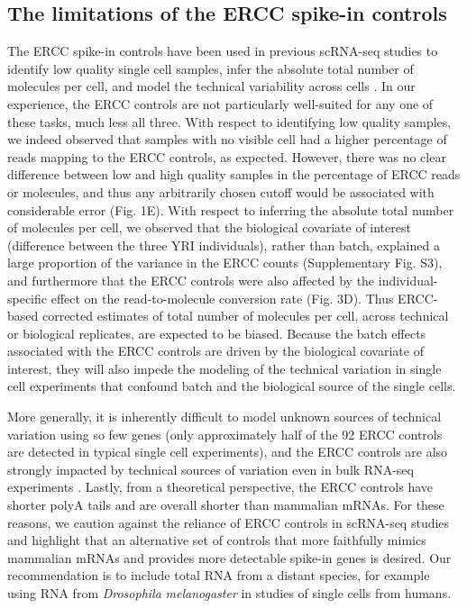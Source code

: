 \subsection{The limitations of the ERCC spike-in
controls}\label{the-limitations-of-the-ercc-spike-in-controls}

The ERCC spike-in controls have been used in previous scRNA-seq studies
to identify low quality single cell samples, infer the absolute total
number of molecules per cell, and model the technical variability across
cells \citep{Brennecke2013, Grun2014, Ding2015, Vallejos2015}. In our
experience, the ERCC controls are not particularly well-suited for any
one of these tasks, much less all three. With respect to identifying low
quality samples, we indeed observed that samples with no visible cell
had a higher percentage of reads mapping to the ERCC controls, as
expected. However, there was no clear difference between low and high
quality samples in the percentage of ERCC reads or molecules, and thus
any arbitrarily chosen cutoff would be associated with considerable
error (Fig. 1E). With respect to inferring the absolute total number of
molecules per cell, we observed that the biological covariate of
interest (difference between the three YRI individuals), rather than
batch, explained a large proportion of the variance in the ERCC counts
(Supplementary Fig. S3), and furthermore that the ERCC controls were
also affected by the individual-specific effect on the read-to-molecule
conversion rate (Fig. 3D). Thus ERCC-based corrected estimates of total
number of molecules per cell, across technical or biological replicates,
are expected to be biased. Because the batch effects associated with the
ERCC controls are driven by the biological covariate of interest, they
will also impede the modeling of the technical variation in single cell
experiments that confound batch and the biological source of the single
cells.

More generally, it is inherently difficult to model unknown sources of
technical variation using so few genes \citep{Risso2014} (only
approximately half of the 92 ERCC controls are detected in typical
single cell experiments), and the ERCC controls are also strongly
impacted by technical sources of variation even in bulk RNA-seq
experiments \citep{SEQC/MAQC-IIIConsortium2014}. Lastly, from a
theoretical perspective, the ERCC controls have shorter polyA tails and
are overall shorter than mammalian mRNAs. For these reasons, we caution
against the reliance of ERCC controls in scRNA-seq studies and highlight
that an alternative set of controls that more faithfully mimics
mammalian mRNAs and provides more detectable spike-in genes is desired.
Our recommendation is to include total RNA from a distant species, for
example using RNA from \emph{Drosophila} \emph{melanogaster} in studies
of single cells from humans.

